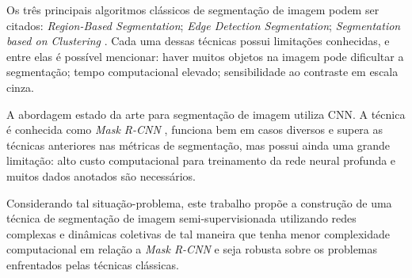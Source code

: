 Os três principais algoritmos clássicos de segmentação de imagem podem
ser citados: \textit{Region-Based Segmentation}; \textit{Edge Detection
  Segmentation}; \textit{Segmentation based on Clustering}
\cite{ImageSegmentationTechniques1985}. Cada uma dessas técnicas
possui limitações conhecidas, e entre elas é possível mencionar: haver
muitos objetos na imagem pode dificultar a segmentação; tempo
computacional elevado; sensibilidade ao contraste em escala cinza.

A abordagem estado da arte para segmentação de imagem utiliza
\gls{CNN}. A técnica é conhecida como \textit{Mask R-CNN}
\cite{he2018mask}, funciona bem em casos diversos e supera as técnicas
anteriores nas métricas de segmentação, mas possui ainda uma grande
limitação: alto custo computacional para treinamento da rede neural
profunda e muitos dados anotados são necessários.

Considerando tal situação-problema, este trabalho propõe a construção
de uma técnica de segmentação de imagem semi-supervisionada utilizando
redes complexas e dinâmicas coletivas de tal maneira que tenha menor
complexidade computacional em relação a \textit{Mask R-CNN} e seja
robusta sobre os problemas enfrentados pelas técnicas clássicas.
